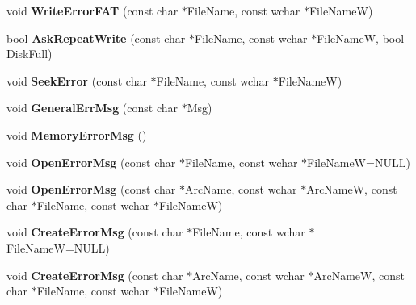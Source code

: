 \begin{DoxyCompactItemize}
\item 
\hypertarget{class_error_handler_ac3b7d29de62895ee52f0418be18baa38}{void {\bfseries Write\-Error\-F\-A\-T} (const char $\ast$File\-Name, const wchar $\ast$File\-Name\-W)}\label{class_error_handler_ac3b7d29de62895ee52f0418be18baa38}

\item 
\hypertarget{class_error_handler_ace50152e9951ace7d7282fa977af370f}{bool {\bfseries Ask\-Repeat\-Write} (const char $\ast$File\-Name, const wchar $\ast$File\-Name\-W, bool Disk\-Full)}\label{class_error_handler_ace50152e9951ace7d7282fa977af370f}

\item 
\hypertarget{class_error_handler_aba3505f65f04e88336a8ee928fc418fe}{void {\bfseries Seek\-Error} (const char $\ast$File\-Name, const wchar $\ast$File\-Name\-W)}\label{class_error_handler_aba3505f65f04e88336a8ee928fc418fe}

\item 
\hypertarget{class_error_handler_a9007bfe9f6fcd70afaf01bb058af96f8}{void {\bfseries General\-Err\-Msg} (const char $\ast$Msg)}\label{class_error_handler_a9007bfe9f6fcd70afaf01bb058af96f8}

\item 
\hypertarget{class_error_handler_a1bec4ce4887d2fe7de76aec3157efcfb}{void {\bfseries Memory\-Error\-Msg} ()}\label{class_error_handler_a1bec4ce4887d2fe7de76aec3157efcfb}

\item 
\hypertarget{class_error_handler_a488606304d3f4c48e92812c1d48e5aee}{void {\bfseries Open\-Error\-Msg} (const char $\ast$File\-Name, const wchar $\ast$File\-Name\-W=N\-U\-L\-L)}\label{class_error_handler_a488606304d3f4c48e92812c1d48e5aee}

\item 
\hypertarget{class_error_handler_af74f303e2d9bfd16f13a1dc02c4bb637}{void {\bfseries Open\-Error\-Msg} (const char $\ast$Arc\-Name, const wchar $\ast$Arc\-Name\-W, const char $\ast$File\-Name, const wchar $\ast$File\-Name\-W)}\label{class_error_handler_af74f303e2d9bfd16f13a1dc02c4bb637}

\item 
\hypertarget{class_error_handler_ac7aabf8de9a2a5e21286a61755842aba}{void {\bfseries Create\-Error\-Msg} (const char $\ast$File\-Name, const wchar $\ast$File\-Name\-W=N\-U\-L\-L)}\label{class_error_handler_ac7aabf8de9a2a5e21286a61755842aba}

\item 
\hypertarget{class_error_handler_a50edd97c4397064bf09ff30eea7e1e0c}{void {\bfseries Create\-Error\-Msg} (const char $\ast$Arc\-Name, const wchar $\ast$Arc\-Name\-W, const char $\ast$File\-Name, const wchar $\ast$File\-Name\-W)}\label{class_error_handler_a50edd97c4397064bf09ff30eea7e1e0c}


\end{DoxyCompactItemize}
